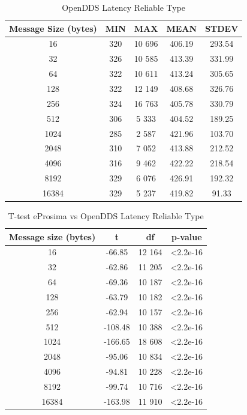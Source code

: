 \documentclass{csfourzero}
\begin{document}
\begin{table}[!h]
	\centering
	\caption{OpenDDS Latency Reliable Type}
	\label{openDDS-latency-table}
	\begin{tabular}{|c|c|c|c|c|}
		\hline 
		Message Size (bytes)& MIN & MAX & MEAN & STDEV \\ 
		\hline 
		16 & 320 & 10 696 & 406.19 & 293.54 \\ 
		\hline 
		32 & 326 & 10 585 & 413.39 & 331.99 \\ 
		\hline 
		64 & 322 & 10 611 & 413.24 & 305.65 \\ 
		\hline 
		128 & 322 & 12 149 & 408.68 & 326.76 \\ 
		\hline 
		256 & 324 & 16 763 & 405.78 & 330.79 \\ 
		\hline 
		512 & 306 & 5 333 & 404.52 & 189.25 \\ 
		\hline 
		1024 & 285 & 2 587 & 421.96 & 103.70 \\ 
		\hline 
		2048 & 310 & 7 052 & 413.88 & 212.52 \\ 
		\hline 
		4096 & 316 & 9 462 & 422.22 & 218.54 \\ 
		\hline 
		8192 & 329 & 6 076 & 426.91 & 192.32 \\ 
		\hline 
		16384 & 329 & 5 237 & 419.82 & 91.33 \\ 
		\hline 
	\end{tabular}
\end{table}

\begin{table}[!h]
	\centering
	\caption{T-test eProsima vs OpenDDS Latency Reliable Type}
	\label{T-test-latency-table}
	\begin{tabular}{|c|c|c|c|}
		\hline 
		Message size (bytes) & t & df & p-value \\ 
		\hline 
		16 & -66.85 & 12 164 & \textless 2.2e-16 \\ 
		\hline 
		32 & -62.86 & 11 205 & \textless 2.2e-16 \\ 
		\hline 
		64 & -69.36 & 10 187 & \textless 2.2e-16 \\ 
		\hline 
		128 & -63.79 & 10 182 & \textless 2.2e-16 \\ 
		\hline 
		256 & -62.94 & 10 157 & \textless 2.2e-16 \\ 
		\hline 
		512 & -108.48 & 10 388 & \textless 2.2e-16 \\ 
		\hline 
		1024 & -166.65 & 18 608 & \textless 2.2e-16 \\ 
		\hline 
		2048 & -95.06 & 10 834 & \textless 2.2e-16 \\ 
		\hline 
		4096 & -94.81 & 10 228 & \textless 2.2e-16 \\ 
		\hline 
		8192 & -99.74 & 10 716 & \textless 2.2e-16 \\ 
		\hline 
		16384 & -163.98 & 11 910 & \textless 2.2e-16 \\ 
		\hline 
	\end{tabular} 
\end{table}
\end{document}
